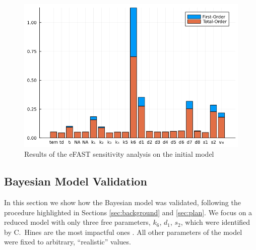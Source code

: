 \documentclass[11pt]{article}
\begin{document}
\begin{figure}[!ht]
    \centering\includegraphics[scale=0.4]{Images/batch2/eFAST_old.png}
    \caption{Results of the eFAST sensitivity analysis on the initial model}
    \label{fig:efast}
\end{figure}

\subsection{Bayesian Model Validation}
In this section we show how the Bayesian model was validated, following the procedure highlighted in Sections \ref{sec:background} and \ref{sec:plan}. We focus on a reduced model with only three free parameters, $k_6$, $d_1$, $s_2$, which were identified by C.~Hines are the most impactful ones \cite{christian1}. All other parameters of the model were fixed to arbitrary, ``realistic'' values. 
\end{document}
